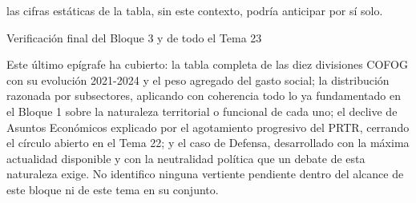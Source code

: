 \documentclass[10pt,a4paper]{article}
\begin{document}
las cifras estáticas de la tabla, sin este contexto, podría anticipar por sí solo.

Verificación final del Bloque 3 y de todo el Tema 23

Este último epígrafe ha cubierto: la tabla completa de las diez divisiones COFOG con su evolución 2021-2024 y el peso agregado del gasto social; la distribución razonada por subsectores, aplicando con coherencia todo lo ya fundamentado en el Bloque 1 sobre la naturaleza territorial o funcional de cada uno; el declive de Asuntos Económicos explicado por el agotamiento progresivo del PRTR, cerrando el círculo abierto en el Tema 22; y el caso de Defensa, desarrollado con la máxima actualidad disponible y con la neutralidad política que un debate de esta naturaleza exige. No identifico ninguna vertiente pendiente dentro del alcance de este bloque ni de este tema en su conjunto.
\end{document}
